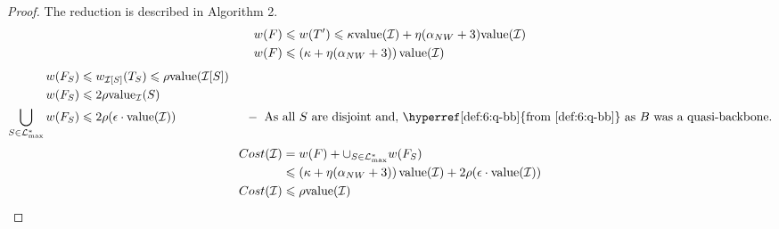 \documentclass[./main.tex]{subfiles}
\begin{document}
	\begin{proof}
		The reduction is described in Algorithm 2.
		\begin{align*}
			w(F) &\leqslant w(T') \leqslant \kappa\textup{value}(\mathcal{I}) + \eta(\alpha_{NW} + 3)\textup{value}(\mathcal{I}) \\
			w(F) &\leqslant \left(\kappa + \eta(\alpha_{NW} + 3)\right)\textup{value}(\mathcal{I})
		\end{align*}
		\begin{align*}
			w(F_S) &\leqslant w_{\calI[S]}(T_S) \leqslant \rho \val(\calI[S])\\
			w(F_S)&\leqslant 2\rho\val_{\calI}(S)\\
			\bigcup_{S \in \lam^*_{\max}} w(F_S) &\leqslant 2\rho (\epsilon\cdot\val(\calI))  \hspace*{2cm} -  \text{ As all $S$ are disjoint and, \hyperref[def:6:q-bb]{from \ref{def:6:q-bb}} as $B$ was a quasi-backbone.}
		\end{align*}
		\begin{align*}
			Cost(\mathcal{I}) &= w(F) + \cup_{S \in \mathcal{L}^*_{\max}} w(F_S)\\
			&\leqslant \left(\kappa + \eta(\alpha_{NW} + 3)\right)\textup{value}(\mathcal{I}) + 2\rho (\epsilon\cdot \textup{value}(\mathcal{I}))\\
			Cost(\mathcal{I}) &\leqslant \rho\textup{value}(\mathcal{I})
		\end{align*}

	\end{proof}
\end{document}
